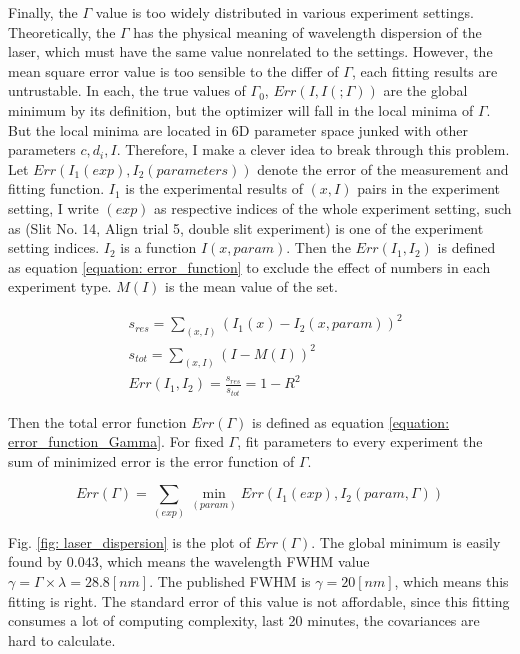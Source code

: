 \documentclass{article}
\begin{document}
Finally, the $\Gamma$ value is too widely distributed in various experiment settings.
Theoretically, the $\Gamma$ has the physical meaning of wavelength dispersion of the laser, which must have the same value nonrelated to the settings.
However, the mean square error value is too sensible to the differ of $\Gamma$, each fitting results are untrustable.
In each, the true values of $\Gamma_0$, $Err(I, I(;\Gamma))$ are the global minimum by its definition, but the optimizer will fall in the local minima of $\Gamma$.
But the local minima are located in 6D parameter space junked with other parameters $c, d_i, I$.
Therefore, I make a clever idea to break through this problem.
Let $Err(I_1(exp), I_2(parameters))$ denote the error of the measurement and fitting function.
$I_1$ is the experimental results of $(x, I)$ pairs in the experiment setting, I write $(exp)$ as respective indices of the whole experiment setting, such as (Slit No. 14, Align trial 5, double slit experiment) is one of the experiment setting indices.
$I_2$ is a function $I(x,param)$.
Then the $Err(I_1, I_2)$ is defined as equation \ref{equation: error_function} to exclude the effect of numbers in each experiment type.
$M(I)$ is the mean value of the set.

\begin{align}
  &s_{res} = \sum_{(x,I)} (I_1(x)-I_2(x,param))^2 \nonumber\\
  &s_{tot} = \sum_{(x,I)}(I- M(I))^2 \nonumber\\
  &Err(I_1, I_2) = \frac{s_{res}}{ s_{tot}} = 1-R^2 \label{equation: error_function}
\end{align}

Then the total error function $Err(\Gamma)$ is defined as equation \ref{equation: error_function_Gamma}.
For fixed $\Gamma$, fit parameters to every experiment the sum of minimized error is the error function of $\Gamma$.

\begin{equation}
  Err(\Gamma) = \sum_{(exp)} \min_{(param)} Err(I_1 (exp), I_2(param, \Gamma))
  \label{equation: error_function_Gamma}
\end{equation}

Fig. \ref{fig: laser_dispersion} is the plot of $Err(\Gamma)$.
The global minimum is easily found by $0.043$, which means the wavelength FWHM value $\gamma = \Gamma \times \lambda = 28.8 [nm]$.
The published FWHM is $\gamma = 20 [nm]$, which means this fitting is right.
The standard error of this value is not affordable, since this fitting consumes a lot of computing complexity, last 20 minutes, the covariances are hard to calculate.
\end{document}
